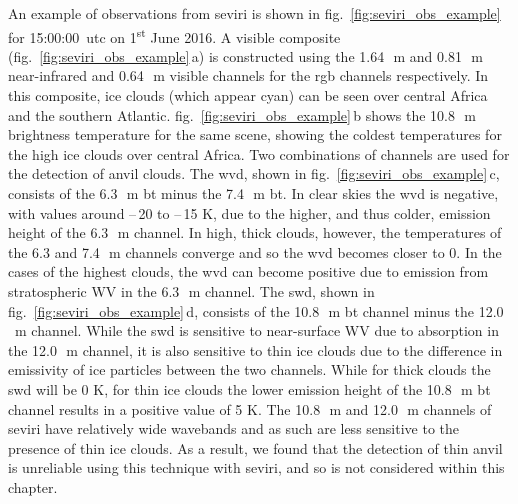 An example of observations from \acrshort{seviri} is shown in fig.~\ref{fig:seviri_obs_example} for 15:00:00~\acrshort{utc} on 1\textsuperscript{st} June 2016. 
A visible composite (fig.~\ref{fig:seviri_obs_example}\,a) is constructed using the 1.64\,\unit{\mu m} and 0.81\,\unit{\mu m} near-infrared and 0.64\,\unit{\mu m} visible channels for the \acrshort{rgb} channels respectively. 
In this composite, ice clouds (which appear cyan) can be seen over central Africa and the southern Atlantic. fig.~\ref{fig:seviri_obs_example}\,b shows the 10.8\,\unit{\mu m} brightness temperature for the same scene, showing the coldest temperatures for the high ice clouds over central Africa. 
Two combinations of channels are used for the detection of anvil clouds. 
The \acrshort{wvd}, shown in fig.~\ref{fig:seviri_obs_example}\,c, consists of the 6.3\,\unit{\mu m} \acrshort{bt} minus the 7.4\,\unit{\mu m} \acrshort{bt}. 
In clear skies the \acrshort{wvd} is negative, with values around --\,20 to --\,15 K, due to the higher, and thus colder, emission height of the 6.3\,\unit{\mu m} channel. 
In high, thick clouds, however, the temperatures of the 6.3 and 7.4\,\unit{\mu m} channels converge and so the \acrshort{wvd} becomes closer to 0. 
In the cases of the highest clouds, the \acrshort{wvd} can become positive due to emission from stratospheric WV in the 6.3\,\unit{\mu m} channel. The \acrshort{swd}, shown in fig.~\ref{fig:seviri_obs_example}\,d, consists of the 10.8\,\unit{\mu m} \acrshort{bt} channel minus the 12.0\,\unit{\mu m} channel. 
While the \acrshort{swd} is sensitive to near-surface WV due to absorption in the 12.0\,\unit{\mu m} channel, it is also sensitive to thin ice clouds due to the difference in emissivity of ice particles between the two channels. 
While for thick clouds the \acrshort{swd} will be 0 K, for thin ice clouds the lower emission height of the 10.8\,\unit{\mu m} \acrshort{bt} channel results in a positive value of 5 K.
The 10.8\,\unit{\mu m} and 12.0\,\unit{\mu m} channels of \acrshort{seviri} have relatively wide wavebands and as such are less sensitive to the presence of thin ice clouds.
As a result, we found that the detection of thin anvil is unreliable using this technique with \acrshort{seviri}, and so is not considered within this chapter.



